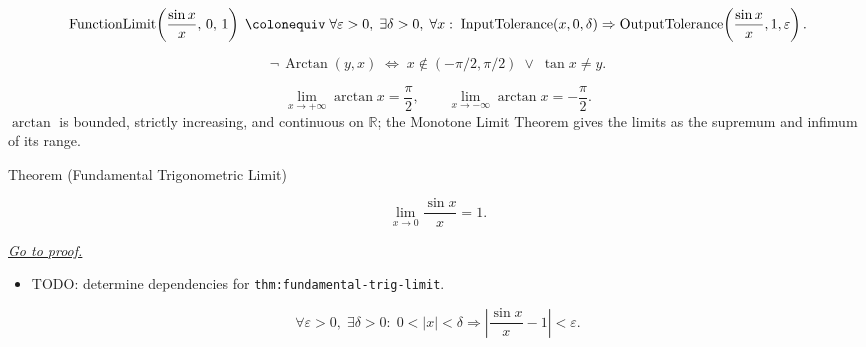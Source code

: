 \begin{remark*}
\[
  \operatorname{FunctionLimit}\!\left(\frac{\sin x}{x},\,0,\,1\right)
  \;\colonequiv\;
  \forall\varepsilon>0,\;\exists\delta>0,\;\forall x:\;
  \operatorname{InputTolerance}(x,0,\delta)
  \Rightarrow
  \operatorname{OutputTolerance}\!\left(\frac{\sin x}{x},1,\varepsilon\right).
\]
\end{remark*}

\begin{remark*}
\[
  \neg\,\operatorname{Arctan}(y,x)
  \;\iff\;
  x\notin(-\pi/2,\pi/2) \;\vee\; \tan x \neq y.
\]
\end{remark*}

\begin{remark*}
\[
  \lim_{x \to +\infty} \arctan x = \frac{\pi}{2},
  \qquad
  \lim_{x \to -\infty} \arctan x = -\frac{\pi}{2}.
\]
$\arctan$ is bounded, strictly increasing, and continuous on
$\mathbb{R}$; the Monotone Limit Theorem gives the limits as the
supremum and infimum of its range.
\end{remark*}


\begin{theorembox}{Theorem (Fundamental Trigonometric Limit)}
\begin{theorem}
\label{thm:fundamental-trig-limit}
\[
  \lim_{x \to 0} \frac{\sin x}{x} = 1.
\]

\smallskip\noindent
\hyperref[prf:fundamental-trig-limit]{\textit{Go to proof.}}
\end{theorem}
\end{theorembox}

\begin{dependencies}
\begin{itemize}
  \item TODO: determine dependencies for \texttt{thm:fundamental-trig-limit}.
\end{itemize}
\end{dependencies}

\begin{remark*}
\[
  \forall\varepsilon > 0,\;
  \exists\delta > 0 :\;
  0 < |x| < \delta \Rightarrow
  \left|\frac{\sin x}{x} - 1\right| < \varepsilon.
\]
\end{remark*}

